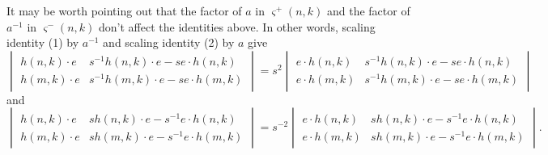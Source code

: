 \begin{remark}
It may be worth pointing out that the factor of $a$ in $\varsigma^+(n, k)$ and the factor of $a^{-1}$ in $\varsigma^-(n, k)$ don't affect the identities above. In other words, scaling identity (1) by $a^{-1}$ and scaling identity (2) by $a$ give 
\begin{equation}
\begin{vmatrix}
h(n, k) \cdot e & s^{-1} h(n, k) \cdot e - s e \cdot h(n, k) \\
h(m, k) \cdot e & s^{-1} h(m, k) \cdot e - s e \cdot h(m, k)
\end{vmatrix}
= s^2
\begin{vmatrix}
e \cdot h(n, k) & s^{-1} h(n, k) \cdot e - s e \cdot h(n, k) \\
e \cdot h(m, k) & s^{-1} h(m, k) \cdot e - s e \cdot h(m, k)
\end{vmatrix}
\end{equation}
and 
\begin{equation}
\begin{vmatrix}
h(n, k) \cdot e &  s h(n, k) \cdot e - s^{-1} e \cdot h(n, k) \\
h(m, k) \cdot e & s h(m, k) \cdot e - s^{-1} e \cdot h(m, k)
\end{vmatrix}
= s^{-2}
\begin{vmatrix}
e \cdot h(n, k) & s h(n, k) \cdot e - s^{-1} e \cdot h(n, k) \\
e \cdot h(m, k) & s h(m, k) \cdot e - s^{-1} e \cdot h(m, k)
\end{vmatrix}.
\end{equation}
\end{remark}

